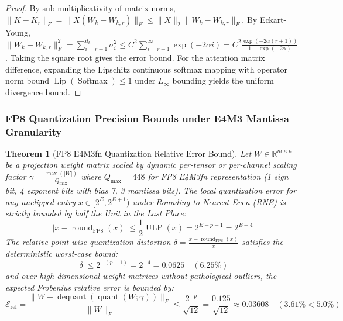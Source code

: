 \documentclass{article}
\newtheorem{theorem}{Theorem}
\begin{document}
\begin{proof}
By sub-multiplicativity of matrix norms, $\|K - K_r\|_F = \|X (W_k - W_{k, r})\|_F \le \|X\|_2 \|W_k - W_{k, r}\|_F$. By Eckart-Young, $\|W_k - W_{k, r}\|_F^2 = \sum_{i=r+1}^{d_k} \sigma_i^2 \le C^2 \sum_{i=r+1}^\infty \exp(-2\alpha i) = C^2 \frac{\exp(-2\alpha(r+1))}{1 - \exp(-2\alpha)}$. Taking the square root gives the error bound. For the attention matrix difference, expanding the Lipschitz continuous softmax mapping with operator norm bound $\operatorname{Lip}(\operatorname{Softmax}) \le 1$ under $L_\infty$ bounding yields the uniform divergence bound.
\end{proof}

\subsubsection{FP8 Quantization Precision Bounds under E4M3 Mantissa Granularity}
\begin{theorem}[FP8 E4M3fn Quantization Relative Error Bound]
\label{thm:fp8_quant_proof}
Let $W \in \mathbb{R}^{m \times n}$ be a projection weight matrix scaled by dynamic per-tensor or per-channel scaling factor $\gamma = \frac{\max(|W|)}{Q_{\max}}$ where $Q_{\max} = 448$ for FP8 E4M3fn representation (1 sign bit, 4 exponent bits with bias 7, 3 mantissa bits). 
The local quantization error for any unclipped entry $x \in [2^E, 2^{E+1})$ under Rounding to Nearest Even (RNE) is strictly bounded by half the Unit in the Last Place:
\begin{equation}
    |x - \operatorname{round}_{\text{FP8}}(x)| \le \frac{1}{2} \operatorname{ULP}(x) = 2^{E - p - 1} = 2^{E - 4}
\end{equation}
The relative point-wise quantization distortion $\delta = \frac{x - \operatorname{round}_{\text{FP8}}(x)}{x}$ satisfies the deterministic worst-case bound:
\begin{equation}
    |\delta| \le 2^{-(p+1)} = 2^{-4} = 0.0625 \quad (6.25\%)
\end{equation}
and over high-dimensional weight matrices without pathological outliers, the expected Frobenius relative error is bounded by:
\begin{equation}
    \mathcal{E}_{\text{rel}} = \frac{\|W - \operatorname{dequant}(\operatorname{quant}(W; \gamma))\|_F}{\|W\|_F} \le \frac{2^{-p}}{\sqrt{12}} = \frac{0.125}{\sqrt{12}} \approx 0.03608 \quad (3.61\% < 5.0\%)
\end{equation}
\end{theorem}
\end{document}
